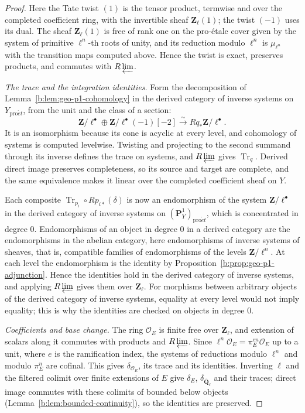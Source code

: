 \documentclass[11pt,a4paper]{article}
\numberwithin{equation}{section}
\theoremstyle{definition}
\theoremstyle{remark}
\newcommand{\Qbar}{\overline{\mathbf Q}_\ell}
\newcommand{\Zl}{\mathbf Z_\ell}
\newcommand{\proet}{\mathrm{pro}\acute{e}t}
\begin{document}
\begin{proof}
Here the Tate twist $(1)$ is the tensor product, termwise and over the
completed coefficient ring, with the invertible sheaf $\Zl(1)$; the
twist $(-1)$ uses its dual. The sheaf $\Zl(1)$ is free of rank one on
the pro-\'etale cover given by the system of primitive $\ell^n$-th roots
of unity, and its reduction modulo $\ell^n$ is $\mu_{\ell^n}$ with the
transition maps computed above. Hence the twist is exact, preserves
products, and commutes with $R\varprojlim$.

\emph{The trace and the integration identities.} Form the decomposition
of Lemma~\ref{b:lem:geo-p1-cohomology} in the derived category of
inverse systems on $Y_{\proet}$, from the unit and the class of a section:
\[
 \mathbf Z/\ell^\bullet\oplus \mathbf Z/\ell^\bullet(-1)[-2]
   \xrightarrow{\ \sim\ }Rq_*\mathbf Z/\ell^\bullet .
\]
It is an isomorphism because its cone is acyclic at every level, and
cohomology of systems is computed levelwise. Twisting and projecting to
the second summand through its inverse defines the trace on systems, and
$R\varprojlim$ gives $\operatorname{Tr}_q$. Derived direct image
preserves completeness, so its source and target are complete, and the
same equivalence makes it linear over the completed coefficient sheaf
on $Y$.

Each composite $\operatorname{Tr}_{p_i}\circ Rp_{i*}(\delta)$ is now an
endomorphism of the system $\mathbf Z/\ell^\bullet$ in the derived
category of inverse systems on $(\mathbf P^1_Y)_{\proet}$, which is concentrated in degree $0$. Endomorphisms of an
object in degree $0$ in a derived category are the endomorphisms in the
abelian category, here endomorphisms of inverse systems of sheaves,
that is, compatible families of endomorphisms of the levels
$\mathbf Z/\ell^n$. At each level the endomorphism is the identity by
Proposition~\ref{b:prop:geo-p1-adjunction}. Hence the identities hold in
the derived category of inverse systems, and applying $R\varprojlim$
gives them over $\Zl$. For morphisms between arbitrary objects of the
derived category of inverse systems, equality at every level would not
imply equality; this is why the identities are checked on objects in
degree $0$.

\emph{Coefficients and base change.} The ring $\mathcal O_E$ is finite
free over $\Zl$, and extension of scalars along it commutes with products
and $R\varprojlim$. Since $\ell^n\mathcal O_E=\pi_E^{en}\mathcal O_E$ up
to a unit, where $e$ is the ramification index, the systems of
reductions modulo $\ell^n$ and modulo $\pi_E^n$ are cofinal. This gives
$\delta_{\mathcal O_E}$, its trace and its identities. Inverting $\ell$
and the filtered colimit over finite extensions of $E$ give
$\delta_E$, $\delta_{\Qbar}$ and their traces; direct image commutes
with these colimits of bounded below objects
(Lemma~\ref{b:lem:bounded-continuity}), so the identities are preserved.


\end{proof}
\end{document}
